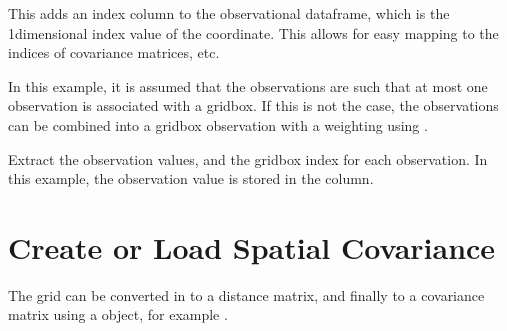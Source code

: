 \documentclass[letterpaper,10pt,english]{sphinxmanual}
\begin{document}
\sphinxAtStartPar
This adds an index column to the observational data\sphinxhyphen{}frame, which is the 1\sphinxhyphen{}dimensional index value of
the coordinate. This allows for easy mapping to the indices of covariance matrices, etc.

\begin{sphinxVerbatim}[commandchars=\\\{\}]
  
\end{sphinxVerbatim}

\sphinxAtStartPar
In this example, it is assumed that the observations are such that at most one observation is
associated with a grid\sphinxhyphen{}box. If this is not the case, the observations can be combined into a
grid\sphinxhyphen{}box \sphinxhyphen{}observation with a weighting using
{\hyperref[\detokenize{kriging:glomar_gridding.kriging.prep_obs_for_kriging}]{}}.

\sphinxAtStartPar
Extract the observation values, and the grid\sphinxhyphen{}box index for each observation. In this example, the
observation value is stored in the  column.

\begin{sphinxVerbatim}[commandchars=\\\{\}]
  \PYG{p}{[}\PYG{p}{]}
  \PYG{p}{[}\PYG{p}{]}
\end{sphinxVerbatim}


\section{Create or Load Spatial Covariance}
\label{\detokenize{workflow:create-or-load-spatial-covariance}}
\sphinxAtStartPar
The grid can be converted in to a distance matrix, and finally to a covariance matrix using a
 object, for example
{\hyperref[\detokenize{covariance:glomar_gridding.variogram.GaussianVariogram}]{}}.
\end{document}
